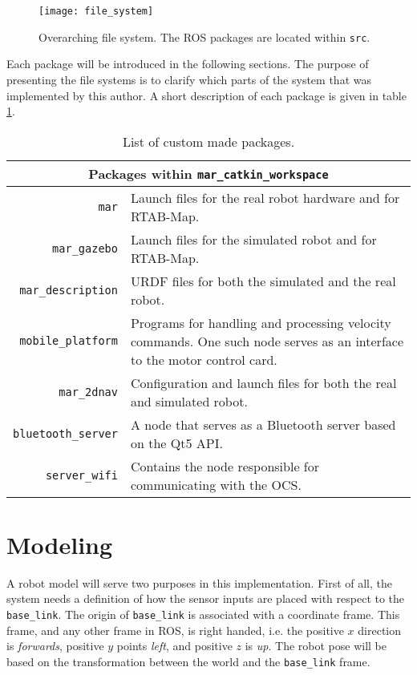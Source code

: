 \begin{figure}[h]
	\centering
	\texttt{[image: file\_system]}
	\caption{Overarching file system. The \ac{ROS} packages are located within \texttt{src}.}
	\label{fig:file_system}
\end{figure}

Each package will be introduced in the following sections. The purpose of presenting the file systems is to clarify which parts of the system that was implemented by this author. A short description of each package is given in table \ref{tab:list_packages}.

\begin{table}
	\centering
	\begin{tabular}{ r p{8.5cm} }
		\hline
		\multicolumn{2}{c}{Packages within \texttt{mar\_catkin\_workspace}}\\
		\hline
		\texttt{mar} & Launch files for the real robot hardware and for \ac{RTAB-Map}.\\
		\texttt{mar\_gazebo} & Launch files for the simulated robot and for \ac{RTAB-Map}.\\
		\texttt{mar\_description} & \ac{URDF} files for both the simulated and the real robot.\\
		\texttt{mobile\_platform} & Programs for handling and processing velocity commands. One such node serves as an interface to the motor control card.\\
		\texttt{mar\_2dnav} & Configuration and launch files for both the real and simulated robot.\\
		\texttt{bluetooth\_server} & A node that serves as a Bluetooth server based on the Qt5 API.\\
		\texttt{server\_wifi} & Contains the node responsible for communicating with the \ac{OCS}.\\
		\hline
	\end{tabular}
	\caption{List of custom made packages.}\label{tab:list_packages}
\end{table}


\section{Modeling}

A robot model will serve two purposes in this implementation. First of all, the system needs a definition of how the sensor inputs are placed with respect to the \texttt{base\_link}. The origin of \texttt{base\_link} is associated  with a coordinate frame. This frame, and any other frame in \ac{ROS}, is right handed, i.e. the positive $x$ direction is \textit{forwards}, positive $y$ points \textit{left}, and positive $z$ is \textit{up}. The robot pose will be based on the transformation between the world and the \texttt{base\_link} frame. 

